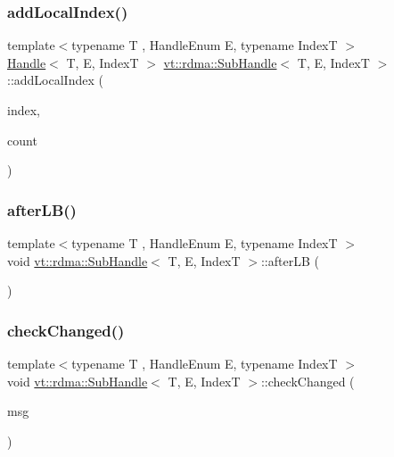\mbox{\label{structvt_1_1rdma_1_1_sub_handle_a24f366ba0fe9d2228d82a2c766bdbf45}} 
\subsubsection{\texorpdfstring{add\+Local\+Index()}{addLocalIndex()}}
{\footnotesize\ttfamily template$<$typename T , Handle\+Enum E, typename IndexT $>$ \\
\hyperlink{structvt_1_1rdma_1_1_handle}{Handle}$<$ T, E, IndexT $>$ \hyperlink{structvt_1_1rdma_1_1_sub_handle}{vt\+::rdma\+::\+Sub\+Handle}$<$ T, E, IndexT $>$\+::add\+Local\+Index (\begin{DoxyParamCaption}\item[{IndexT}]{index,  }\item[{uint64\+\_\+t}]{count }\end{DoxyParamCaption})}

\mbox{\label{structvt_1_1rdma_1_1_sub_handle_a9d441d9e8080998111cc659b8ce725b1}} 
\subsubsection{\texorpdfstring{after\+L\+B()}{afterLB()}}
{\footnotesize\ttfamily template$<$typename T , Handle\+Enum E, typename IndexT $>$ \\
void \hyperlink{structvt_1_1rdma_1_1_sub_handle}{vt\+::rdma\+::\+Sub\+Handle}$<$ T, E, IndexT $>$\+::after\+LB (\begin{DoxyParamCaption}{ }\end{DoxyParamCaption})}

\mbox{\label{structvt_1_1rdma_1_1_sub_handle_af872a0071eac521cb813d998763f5a31}} 
\subsubsection{\texorpdfstring{check\+Changed()}{checkChanged()}}
{\footnotesize\ttfamily template$<$typename T , Handle\+Enum E, typename IndexT $>$ \\
void \hyperlink{structvt_1_1rdma_1_1_sub_handle}{vt\+::rdma\+::\+Sub\+Handle}$<$ T, E, IndexT $>$\+::check\+Changed (\begin{DoxyParamCaption}\item[{\hyperlink{structvt_1_1rdma_1_1impl_1_1_reduce_l_b_msg}{impl\+::\+Reduce\+L\+B\+Msg} $\ast$}]{msg }\end{DoxyParamCaption})}

